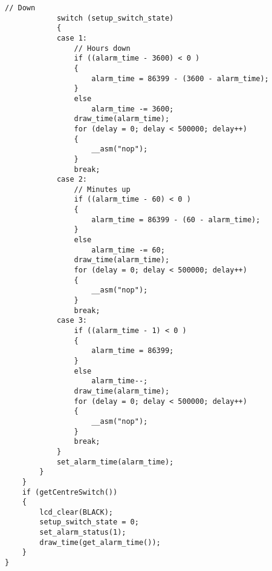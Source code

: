 \documentclass{article}
\begin{document}
\begin{landscape}
\begin{lstlisting}[frame=single]
			// Down
			switch (setup_switch_state)
			{
			case 1:
				// Hours down
				if ((alarm_time - 3600) < 0 )
				{
					alarm_time = 86399 - (3600 - alarm_time);
				}
				else 
					alarm_time -= 3600;
				draw_time(alarm_time);
				for (delay = 0; delay < 500000; delay++)
				{
					__asm("nop");
				}
				break;
			case 2:
				// Minutes up
				if ((alarm_time - 60) < 0 )
				{
					alarm_time = 86399 - (60 - alarm_time);
				}
				else
					alarm_time -= 60;
				draw_time(alarm_time);
				for (delay = 0; delay < 500000; delay++)
				{
					__asm("nop");
				}
				break;
			case 3:
				if ((alarm_time - 1) < 0 )
				{
					alarm_time = 86399;
				}
				else 
					alarm_time--;
				draw_time(alarm_time);
				for (delay = 0; delay < 500000; delay++)
				{
					__asm("nop");
				}
				break;
			}		
			set_alarm_time(alarm_time);
		}
	}
	if (getCentreSwitch())
	{
		lcd_clear(BLACK);
		setup_switch_state = 0;
		set_alarm_status(1);
		draw_time(get_alarm_time());
	}
}


\end{lstlisting}
\end{landscape}
\end{document}
